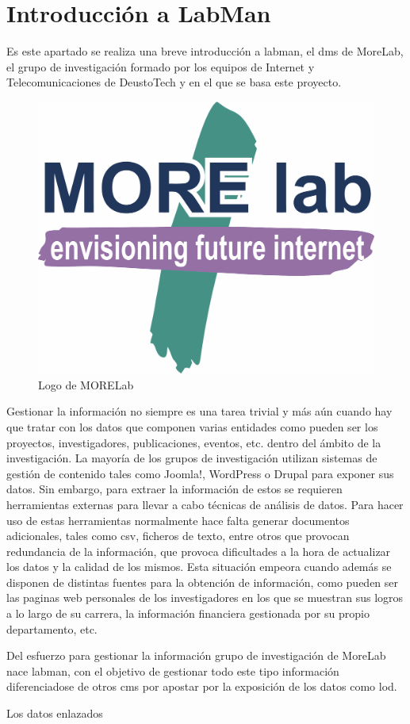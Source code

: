 \section{Introducción a LabMan}

Es este apartado se realiza una breve introducción a \acrfull{labman}, el \acrlong{dms} de MoreLab, el grupo de investigación formado por los equipos de Internet y Telecomunicaciones de DeustoTech y en el que se basa este proyecto.

\begin{figure}[!htp]
	\centering
	\includegraphics[scale=0.15]{fig/morelab-logo}
	\caption{Logo de MORELab}
\end{figure}

Gestionar la información no siempre es una tarea trivial y más aún cuando hay que tratar con los datos que componen varias entidades como pueden ser los proyectos, investigadores, publicaciones, eventos, etc. dentro del ámbito de la investigación. La mayoría de los grupos de investigación utilizan sistemas de gestión de contenido tales como Joomla!\cite{joomla}, WordPress\cite{wordpress} o Drupal\cite{drupal} para exponer sus datos. Sin embargo, para extraer la información de estos  se requieren herramientas externas para llevar a cabo técnicas de análisis de datos. 
Para hacer uso de estas herramientas normalmente hace falta generar documentos adicionales, tales como \acrshort{csv}, ficheros de texto, entre otros que provocan redundancia de la información, que provoca dificultades a la hora de actualizar los datos y la calidad de los mismos. Esta situación empeora cuando además se disponen de distintas fuentes para la obtención de información, como pueden ser las paginas web personales de los investigadores en los que se muestran sus logros a lo largo de su carrera, la información financiera gestionada por su propio departamento, etc.

Del esfuerzo para gestionar la información grupo de investigación de MoreLab nace {labman}, con el objetivo de gestionar todo este tipo información diferenciadose de otros \acrshort{cms} por apostar por la exposición de los datos como \acrlong{lod}\cite{linkeddata}.

Los datos enlazados\cite{pena_visual_2014}
